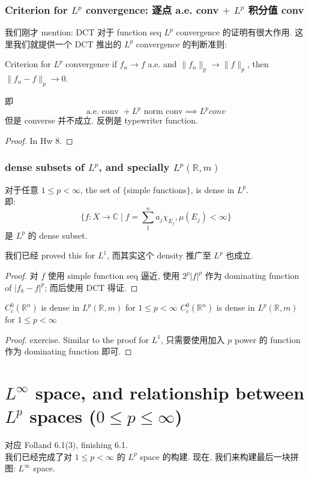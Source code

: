 \documentclass[lang=cn,11pt]{elegantbook}
\begin{document}
\subsection{Criterion for $L^p$ convergence: 逐点 a.e. conv $+$ $L^p$ 积分值 conv}
我们刚才 mention: DCT 对于 function seq $L^p$ convergence 的证明有很大作用. 这里我们就提供一个 DCT 推出的 $L^p$ convergence 的判断准则: 
\begin{theorem}{Criterion for $L^p$ convergence}
    if $f_n\to f$ a.e. and $\|f_n\|_p\to\|f\|_p$, then $\|f_n-f\|_p\to0$. 
\end{theorem}
即 \[
\text{a.e. conv } + L^p\text{  norm conv} \implies L^p conv 
\]
但是 converse 并不成立. 反例是 typewriter function.
\begin{proof}
    In Hw 8.
\end{proof}



\subsection{dense subsets of $L^p$, and specially $L^p(\mathbb{R},m)$ }
\begin{proposition}
    对于任意 $1\leq p < \infty$, the set of $\{$simple functions$\}$, is dense in $L^p$.\\
    即: \[
    \{f:X \to \mathbb{C}\mid f=\sum_1^n  a_j \chi_{E_j},\mu(E_j)<\infty \}
    \]是 $L^p$ 的 dense subset.
\end{proposition}
\begin{remark}
    我们已经 proved this for $L^1$, 而其实这个 density 推广至 $L^p$ 也成立.
\end{remark}
\begin{proof}
对 $f$ 使用 simple function seq 逼近, 使用 $2^p |f|^p$ 作为 dominating function of $|f_k-f|^p$; 而后使用 DCT 得证.
\end{proof}

\begin{theorem}{$C_c^0(\mathbb{R}^n)$ is dense in $L^p(\mathbb{R},m)$ for $1\leq p < \infty$}
$C_c^0(\mathbb{R}^n)$ is dense in $L^p(\mathbb{R},m)$ for $1\leq p < \infty$
\end{theorem}
\begin{proof}
    exercise. Similar to the proof for $L^1$, 只需要使用加入 $p$ power 的 function 作为 dominating function 即可.
\end{proof}






\chapter{$L^\infty$ space, and relationship between $L^p$ spaces ($0\leq p \leq \infty$)}
对应 Folland 6.1(3), finishing 6.1.\\
我们已经完成了对 $1\leq p < \infty$ 的 $L^p$ space 的构建. 现在, 我们来构建最后一块拼图: $L^\infty$ space.
\end{document}
